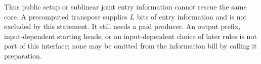 Thus public setup or sublinear joint entry information cannot rescue the
same core. A precomputed transpose supplies $L$ bits of entry information
and is not excluded by this statement. It still needs a paid producer.
An output prefix, input-dependent starting heads, or an input-dependent
choice of later rules is not part of this interface; none may be omitted
from the information bill by calling it preparation.
